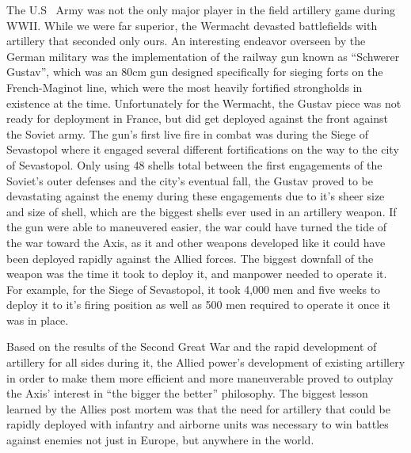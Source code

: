 \documentclass[12pt]{article}
\begin{document}
\vspace{1.1\baselineskip}

The U.S \ Army was not the only major player in the field artillery game during WWII. While we were far superior, the Wermacht
devasted battlefields with artillery that seconded only ours. An interesting endeavor overseen by the German military was the
implementation of the railway gun known as ``Schwerer Gustav'', which was an 80cm gun designed specifically for sieging forts
on the French-Maginot line, which were the most heavily fortified strongholds in existence at the time. Unfortunately for the
Wermacht, the Gustav piece was not ready for deployment in France, but did get deployed against the front against the Soviet
army. The gun's first live fire in combat was during the Siege of Sevastopol where it engaged several different fortifications
on the way to the city of Sevastopol. Only using 48 shells total between the first engagements of the Soviet's outer defenses and
the city's eventual fall, the Gustav proved to be devastating against the enemy during these engagements due to it's sheer size and
size of shell, which are the biggest shells ever used in an artillery weapon. If the gun were able to maneuvered easier, the war
could have turned the tide of the war toward the Axis, as it and other weapons developed like it could have been deployed rapidly
against the Allied forces. The biggest downfall of the weapon was the time it took to deploy it, and manpower needed to operate it.
For example, for the Siege of Sevastopol, it took 4,000 men and five weeks to deploy it to it's firing position as well as 500 men
required to operate it once it was in place.

\vspace{1.0\baselineskip}

Based on the results of the Second Great War and the rapid development of artillery for all sides during it, the Allied power's
development of existing artillery in order to make them more efficient and more maneuverable proved to outplay the Axis' interest
in ``the bigger the better'' philosophy. The biggest lesson learned by the Allies post mortem was that the need for artillery that
could be rapidly deployed with infantry and airborne units was necessary to win battles against enemies not just in Europe, but
anywhere in the world.
\end{document}
